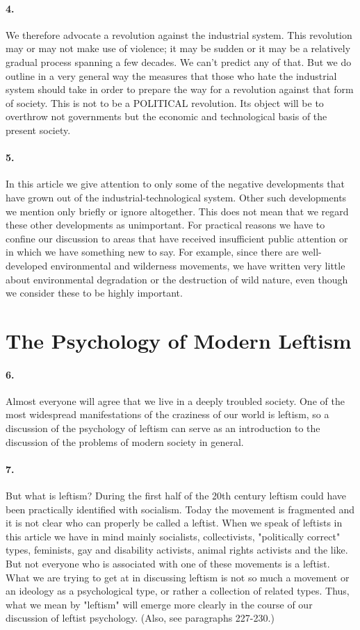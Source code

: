 \documentclass[12pt]{book}
\newcommand{\mysection}[1]{\section*{#1} \addcontentsline{toc}{section}{#1}}
\begin{document}
\paragraph{4.} We therefore advocate a revolution against the industrial system. This revolution may or may not make use of violence; it may be sudden or it may be a relatively gradual process spanning a few decades. We can't predict any of that. But we do outline in a very general way the measures that those who hate the industrial system should take in order to prepare the way for a revolution against that form of society. This is not to be a POLITICAL revolution. Its object will be to overthrow not governments but the economic and technological basis of the present society.


\paragraph{5.} In this article we give attention to only some of the negative developments that have grown out of the industrial-technological system.  Other such developments we mention only briefly or ignore altogether. This does not mean that we regard these other developments as unimportant. For practical reasons we have to confine our discussion to areas that have received insufficient public attention or in which we have something new to say.  For example, since there are well-developed environmental and wilderness movements, we have written very little about environmental degradation or the destruction of wild nature, even though we consider these to be highly important.

\mysection{The Psychology of Modern Leftism}


\paragraph{6.} Almost everyone will agree that we live in a deeply troubled society.  One of the most widespread manifestations of the craziness of our world is leftism, so a discussion of the psychology of leftism can serve as an introduction to the discussion of the problems of modern society in general.


\paragraph{7.} But what is leftism? During the first half of the 20th century leftism could have been practically identified with socialism. Today the movement is fragmented and it is not clear who can properly be called a leftist. When we speak of leftists in this article we have in mind mainly socialists, collectivists, "politically correct" types, feminists, gay and disability activists, animal rights activists and the like. But not everyone who is associated with one of these movements is a leftist. What we are trying to get at in discussing leftism is not so much a movement or an ideology as a psychological type, or rather a collection of related types. Thus, what we mean by "leftism" will emerge more clearly in the course of our discussion of leftist psychology. (Also, see paragraphs 227-230.)
\end{document}
